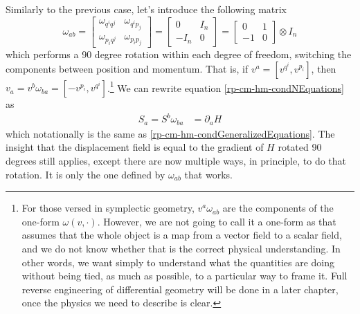 Similarly to the previous case, let's introduce the following matrix
\begin{equation}\label{rp-cm-sf-symplecticForm}
	\tag{SF-ND}
	\omega_{ab} = \left[\begin{array}{cc}
		\omega_{q^i q^j} & \omega_{q^i p_j} \\
		\omega_{p_i q^j} & \omega_{p_i p_j} 
	\end{array} \right]= \left[\begin{array}{cc}
		0 & I_n \\
		- I_n & 0 
	\end{array} \right] = \left[\begin{array}{cc}
	0 & 1 \\
	-1 & 0 
\end{array} \right] \otimes I_n
\end{equation}
which performs a 90 degree rotation within each degree of freedom, switching the components between position and momentum. That is, if $v^a = [v^{q^i}, v^{p_i}]$, then $v_a = v^b \omega_{ba}  = [-v^{p_i}, v^{q^i}]$.\footnote{For those versed in symplectic geometry, $v^a \omega_{ab}$ are the components of the one-form $\omega(v, \cdot)$. However, we are not going to call it a one-form as that assumes that the whole object is a map from a vector field to a scalar field, and we do not know whether that is the correct physical understanding. In other words, we want simply to understand what the quantities are doing without being tied, as much as possible, to a particular way to frame it. Full reverse engineering of differential geometry will be done in a later chapter, once the physics we need to describe is clear.} We can rewrite equation \ref{rp-cm-hm-condNEquations} as
\begin{equation}\label{rp-cm-HamiltonSymp}
	\begin{aligned}
		S_a = S^b \omega_{ba}  &= \partial_a H 
	\end{aligned}
\end{equation}
which notationally is the same as \ref{rp-cm-hm-condGeneralizedEquations}. The insight that the displacement field is equal to the gradient of $H$ rotated 90 degrees still applies, except there are now multiple ways, in principle, to do that rotation. It is only the one defined by $\omega_{ab}$ that works.

